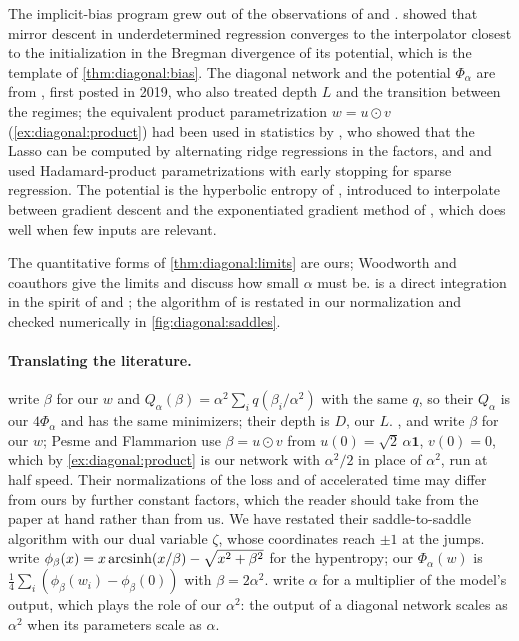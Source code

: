 \begin{refsection}
\notesandrefs
The implicit-bias program grew out of the observations of \textcite{NeyshaburTomiokaSrebro2015} and \textcite{ZhangEtAl2017}. \Textcite{GunasekarEtAl2018} showed that mirror descent in underdetermined regression converges to the interpolator closest to the initialization in the Bregman divergence of its potential, which is the template of \cref{thm:diagonal:bias}. The diagonal network and the potential $\Phi_\alpha$ are from \textcite{WoodworthEtAl2020}, first posted in 2019, who also treated depth $L$ and the transition between the regimes; the equivalent product parametrization $w=u\odot v$ (\cref{ex:diagonal:product}) had been used in statistics by \textcite{Hoff2017}, who showed that the Lasso can be computed by alternating ridge regressions in the factors, and \textcite{VaskeviciusKanadeRebeschini2019} and \textcite{ZhaoYangHe2022} used Hadamard-product parametrizations with early stopping for sparse regression. The potential is the hyperbolic entropy of \textcite{GhaiHazanSinger2020}, introduced to interpolate between gradient descent and the exponentiated gradient method of \textcite{KivinenWarmuth1997}, which does well when few inputs are relevant.

The quantitative forms of \cref{thm:diagonal:limits} are ours; Woodworth and coauthors give the limits and discuss how small $\alpha$ must be.  is a direct integration in the spirit of \textcite{WoodworthEtAl2020} and \textcite{GissinShalevShwartzDaniely2020}; the algorithm of \textcite{PesmeFlammarion2023} is restated in our normalization and checked numerically in \cref{fig:diagonal:saddles}.

\paragraph{Translating the literature.} \Textcite{WoodworthEtAl2020} write $\beta$ for our $w$ and $Q_\alpha(\beta)=\alpha^2\sum_iq(\beta_i/\alpha^2)$ with the same $q$, so their $Q_\alpha$ is our $4\Phi_\alpha$ and has the same minimizers; their depth is $D$, our $L$. \Textcite{PesmeFlammarion2023}, \textcite{PesmePillaudVivienFlammarion2021} and \textcite{EvenEtAl2023} write $\beta$ for our $w$; Pesme and Flammarion use $\beta=u\odot v$ from $u(0)=\sqrt2\,\alpha\mathbf1$, $v(0)=0$, which by \cref{ex:diagonal:product} is our network with $\alpha^2/2$ in place of $\alpha^2$, run at half speed. Their normalizations of the loss and of accelerated time may differ from ours by further constant factors, which the reader should take from the paper at hand rather than from us. We have restated their saddle-to-saddle algorithm with our dual variable $\zeta$, whose coordinates reach $\pm1$ at the jumps. \Textcite{GhaiHazanSinger2020} write $\phi_\beta(x)=x\operatorname{arcsinh}(x/\beta)-\sqrt{x^2+\beta^2}$ for the hypentropy; our $\Phi_\alpha(w)$ is $\frac14\sum_i(\phi_\beta(w_i)-\phi_\beta(0))$ with $\beta=2\alpha^2$. \Textcite{ChizatOyallonBach2019} write $\alpha$ for a multiplier of the model's output, which plays the role of our $\alpha^2$: the output of a diagonal network scales as $\alpha^2$ when its parameters scale as $\alpha$.

\printchapterbib
\end{refsection}
